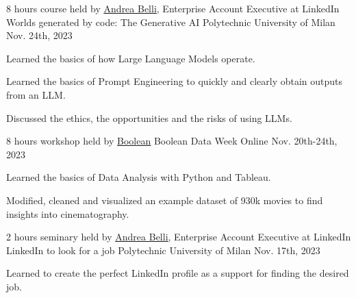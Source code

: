 

\begin{cventries}
  \cventry
    {8 hours course held by \underline{\href{https://www.linkedin.com/in/andrea-belli/}{Andrea Belli}}, Enterprise Account Executive at LinkedIn} %
    {Worlds generated by code: The Generative AI} %
    {Polytechnic University of Milan} %
    {Nov. 24th, 2023} %
    {
      \begin{cvitems} %
        \item {Learned the basics of how Large Language Models operate.}
        \item {Learned the basics of Prompt Engineering to quickly and clearly obtain outputs from an LLM.}
        \item {Discussed the ethics, the opportunities and the risks of using LLMs.}
      \end{cvitems}
    }

  \cventry
    {8 hours workshop held by \underline{\href{https://boolean.careers/}{Boolean}}} %
    {Boolean Data Week} %
    {Online} %
    {Nov. 20th-24th, 2023} %
    {
      \begin{cvitems} %
        \item {Learned the basics of Data Analysis with Python and Tableau.}
        \item {Modified, cleaned and visualized an example dataset of 930k movies to find insights into cinematography.}
      \end{cvitems}
    }

  \cventry
    {2 hours seminary held by \underline{\href{https://www.linkedin.com/in/andrea-belli/}{Andrea Belli}}, Enterprise Account Executive at LinkedIn} %
    {LinkedIn to look for a job} %
    {Polytechnic University of Milan} %
    {Nov. 17th, 2023} %
    {
      \begin{cvitems} %
        \item {Learned to create the perfect LinkedIn profile as a support for finding the desired job.}
      \end{cvitems}
    }


\end{cventries}

